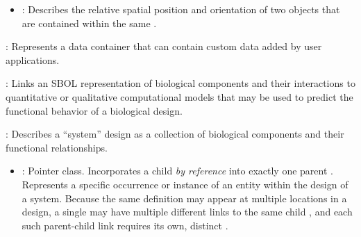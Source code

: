 \begin{description}
\begin{itemize}
\item \emph{}:
Describes the relative spatial position and orientation of two  objects that are contained within the same .
\end{itemize}

\item \emph{}:
Represents a data container that can contain custom data added by user applications.

\item \emph{}:
Links an SBOL representation of biological components and their interactions to quantitative or qualitative computational models that may be used to predict the functional behavior of a biological design.

\item \emph{}:
Describes a ``system'' design as a collection of biological components and their functional relationships.

\begin{itemize}
\item \emph{}:
Pointer class. Incorporates a child  \textit{by reference} into exactly one parent . Represents a specific occurrence or instance of an entity within the design of a system. Because the same definition may appear at multiple locations in a design, a single  may have multiple different links to the same child , and each such parent-child link requires its own, distinct .


\end{itemize}
\end{description}
